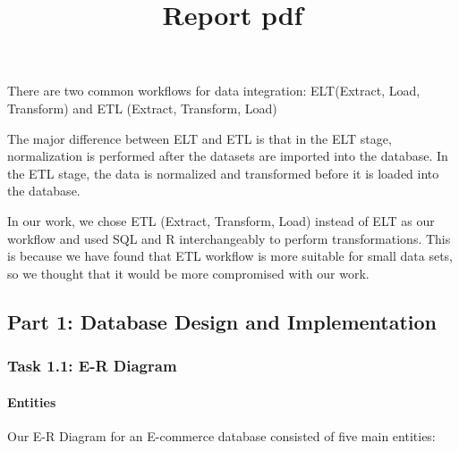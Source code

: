 \documentclass[
  letterpaper,
  DIV=11,
  numbers=noendperiod]{scrartcl}
\title{Report pdf}
\author{}
\date{}
\let\oldparagraph\paragraph
\renewcommand{\paragraph}[1]{\oldparagraph{#1}\mbox{}}
\begin{document}
\maketitle
\ifdefined\Shaded\renewenvironment{Shaded}{\begin{tcolorbox}[frame hidden, boxrule=0pt, interior hidden, sharp corners, breakable, enhanced, borderline west={3pt}{0pt}{shadecolor}]}{\end{tcolorbox}}\fi

There are two common workflows for data integration: ELT(Extract, Load,
Transform) and ETL (Extract, Transform, Load)

The major difference between ELT and ETL is that in the ELT stage,
normalization is performed after the datasets are imported into the
database. In the ETL stage, the data is normalized and transformed
before it is loaded into the database.

In our work, we chose ETL (Extract, Transform, Load) instead of ELT as
our workflow and used SQL and R interchangeably to perform
transformations. This is because we have found that ETL workflow is more
suitable for small data sets, so we thought that it would be more
compromised with our work.

\hypertarget{part-1-database-design-and-implementation}{%
\subsection{Part 1: Database Design and
Implementation}\label{part-1-database-design-and-implementation}}

\hypertarget{task-1.1-e-r-diagram}{%
\subsubsection{Task 1.1: E-R Diagram}\label{task-1.1-e-r-diagram}}

\hypertarget{entities}{%
\paragraph{Entities}\label{entities}}

Our E-R Diagram for an E-commerce database consisted of five main
entities:
\end{document}
